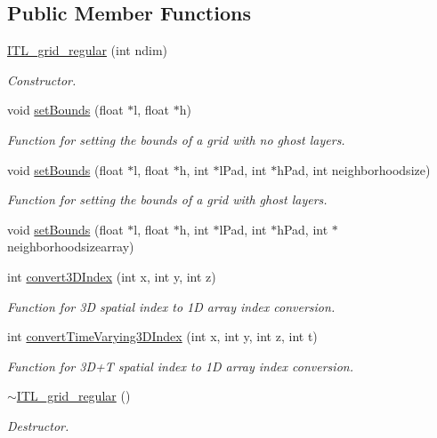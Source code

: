 \subsection*{Public Member Functions}
\begin{DoxyCompactItemize}
\item 
\hyperlink{classITL__grid__regular_a6fc8f7b939590292ec89bf0e69dd3329}{ITL\_\-grid\_\-regular} (int ndim)
\begin{DoxyCompactList}\small\item\em Constructor. \item\end{DoxyCompactList}\item 
void \hyperlink{classITL__grid__regular_aae7fcdd0c0da2df91cbe6b658a7ce43c}{setBounds} (float $\ast$l, float $\ast$h)
\begin{DoxyCompactList}\small\item\em Function for setting the bounds of a grid with no ghost layers. \item\end{DoxyCompactList}\item 
void \hyperlink{classITL__grid__regular_ac64d7fd91b4330f961979a6d7127d9f6}{setBounds} (float $\ast$l, float $\ast$h, int $\ast$lPad, int $\ast$hPad, int neighborhoodsize)
\begin{DoxyCompactList}\small\item\em Function for setting the bounds of a grid with ghost layers. \item\end{DoxyCompactList}\item 
void \hyperlink{classITL__grid__regular_a324d135ffc7a8e3dab70933f036c7e5a}{setBounds} (float $\ast$l, float $\ast$h, int $\ast$lPad, int $\ast$hPad, int $\ast$neighborhoodsizearray)
\item 
int \hyperlink{classITL__grid__regular_a9561a0c36a74216eef9685d5f3369f7a}{convert3DIndex} (int x, int y, int z)
\begin{DoxyCompactList}\small\item\em Function for 3D spatial index to 1D array index conversion. \item\end{DoxyCompactList}\item 
int \hyperlink{classITL__grid__regular_a6172df2903ce28b33f158ccaa3741774}{convertTimeVarying3DIndex} (int x, int y, int z, int t)
\begin{DoxyCompactList}\small\item\em Function for 3D+T spatial index to 1D array index conversion. \item\end{DoxyCompactList}\item 
\hyperlink{classITL__grid__regular_a360a8aba9edd80a56d2f0020c89d1287}{$\sim$ITL\_\-grid\_\-regular} ()
\begin{DoxyCompactList}\small\item\em Destructor. \item\end{DoxyCompactList}\end{DoxyCompactItemize}


